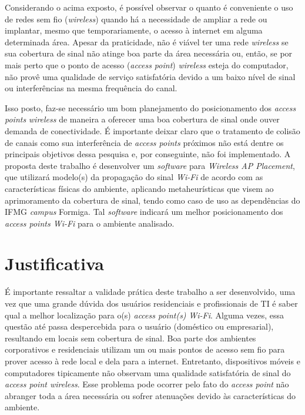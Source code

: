 \documentclass[
	12pt,				%
	twoside,			%
	a4paper,			%
	english,			%
	french,				%
	spanish,			%
	brazil				%
	]{abntex2}
\begin{document}
Considerando o acima exposto, é possível observar o quanto é conveniente
o uso de redes sem fio (\emph{wireless}) quando há a necessidade de
ampliar a rede ou implantar, mesmo que temporariamente, o acesso à
internet em alguma determinada área. Apesar da praticidade, não é viável
ter uma rede \emph{wireless} se sua cobertura de sinal não atinge boa
parte da área necessária ou, então, se por mais perto que o ponto de
acesso (\emph{access point}) \emph{wireless} esteja do computador, não
provê uma qualidade de serviço satisfatória devido a um baixo nível de
sinal ou interferências na mesma frequência do canal.

Isso posto, faz-se necessário um bom planejamento do posicionamento dos
\emph{access points} \emph{wireless} de maneira a oferecer uma boa
cobertura de sinal onde ouver demanda de conectividade. É importante
deixar claro que o tratamento de colisão de canais como sua
interferência de \emph{access points} próximos não está dentre os
principais objetivos dessa pesquisa e, por conseguinte, não foi
implementado. A proposta deste trabalho é desenvolver um \emph{software}
para \emph{Wireless AP Placement}, que utilizará modelo(s) da propagação
do sinal \emph{Wi-Fi} de acordo com as características físicas do
ambiente, aplicando metaheurísticas que visem ao aprimoramento da
cobertura de sinal, tendo como caso de uso as dependências do IFMG
\emph{campus} Formiga. Tal \emph{software} indicará um melhor
posicionamento dos \emph{access points Wi-Fi} para o ambiente analisado.

\section{Justificativa}\label{justificativa}

É importante ressaltar a validade prática deste trabalho a ser
desenvolvido, uma vez que uma grande dúvida dos usuários residenciais e
profissionais de TI é saber qual a melhor localização para o(s)
\emph{access point(s)} \emph{Wi-Fi}. Alguma vezes, essa questão até
passa despercebida para o usuário (doméstico ou empresarial), resultando
em locais sem cobertura de sinal. Boa parte dos ambientes corporativos e
residenciais utilizam um ou mais pontos de acesso sem fio para prover
acesso à rede local e dela para a internet. Entretanto, dispositivos
móveis e computadores tipicamente não observam uma qualidade
satisfatória de sinal do \emph{access point wireless}. Esse problema
pode ocorrer pelo fato do \emph{access point} não abranger toda a área
necessária ou sofrer atenuações devido às características do ambiente.
\end{document}
